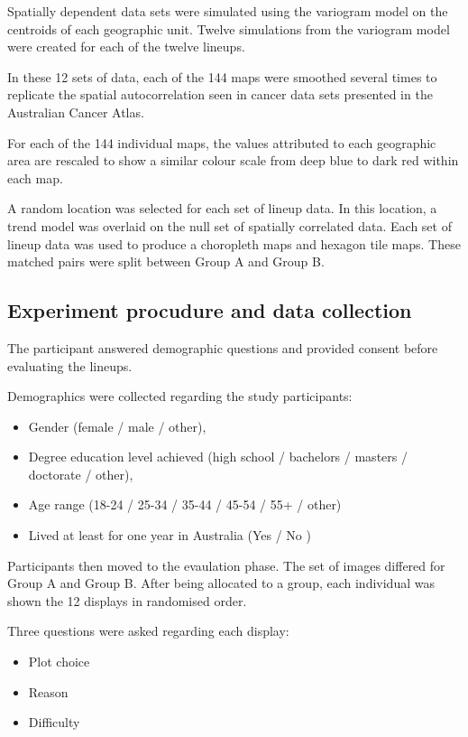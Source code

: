 \documentclass[conference,final,]{IEEEtran}
\providecommand{\tightlist}{%
  \setlength{\itemsep}{0pt}\setlength{\parskip}{0pt}}
\begin{document}
Spatially dependent data sets were simulated using the variogram model on the centroids of each geographic unit. Twelve simulations from the variogram model were created for each of the twelve lineups.

In these 12 sets of data, each of the 144 maps were smoothed several times to replicate the spatial autocorrelation seen in cancer data sets presented in the Australian Cancer Atlas.

For each of the 144 individual maps, the values attributed to each geographic area are rescaled to show a similar colour scale from deep blue to dark red within each map.

A random location was selected for each set of lineup data.
In this location, a trend model was overlaid on the null set of spatially correlated data.
Each set of lineup data was used to produce a choropleth maps and hexagon tile maps. These matched pairs were split between Group A and Group B.

\hypertarget{experiment-procudure-and-data-collection}{%
\subsection{Experiment procudure and data collection}\label{experiment-procudure-and-data-collection}}

The participant answered demographic questions and provided consent before evaluating the lineups.

Demographics were collected regarding the study participants:

\begin{itemize}
\tightlist
\item
  Gender (female / male / other),
\item
  Degree education level achieved (high school / bachelors / masters / doctorate / other),
\item
  Age range (18-24 / 25-34 / 35-44 / 45-54 / 55+ / other)
\item
  Lived at least for one year in Australia (Yes / No )
\end{itemize}

Participants then moved to the evaulation phase.
The set of images differed for Group A and Group B.
After being allocated to a group, each individual was shown the 12 displays in randomised order.

Three questions were asked regarding each display:

\begin{itemize}
\tightlist
\item
  Plot choice
\item
  Reason
\item
  Difficulty
\end{itemize}
\end{document}
